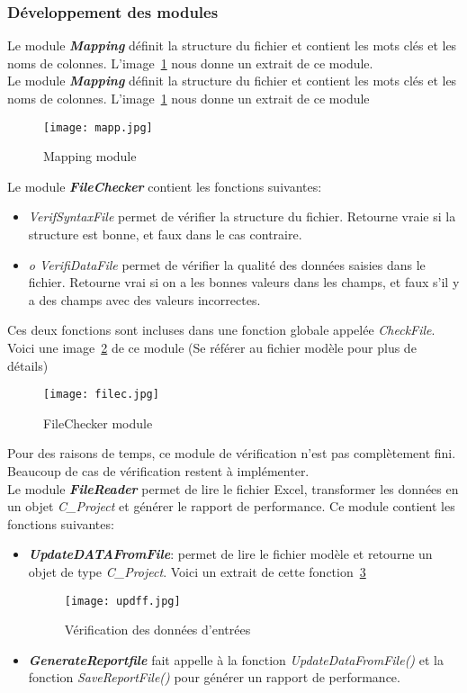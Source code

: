 \subsubsection*{Développement des modules}
Le module \textbf{\textit{Mapping}} définit la structure du fichier et contient les mots clés et les noms de colonnes. L'image~\ref{mapp} nous donne un extrait de ce module.\\
Le module \textbf{\textit{Mapping}} définit la structure du fichier et contient les mots clés et les noms de colonnes. L'image~\ref{mapp} nous donne un extrait de ce module
\begin{figure}[h]
\centering
\texttt{[image: mapp.jpg]}
\caption{\label{mapp}Mapping module}
\end{figure}
\clearpage
Le module \textbf{\textit{FileChecker}} contient les fonctions suivantes:
\begin{itemize}
\item \textit{VerifSyntaxFile} permet de vérifier la structure du fichier. Retourne vraie si la structure est bonne, et faux dans le cas contraire.
\item \textit{o	VerifiDataFile} permet de vérifier la qualité des données saisies dans le fichier. Retourne vrai si on a les bonnes valeurs dans les champs, et faux s'il y a des champs avec des valeurs incorrectes.
\end{itemize}
Ces deux fonctions sont incluses dans une fonction globale appelée \textit{CheckFile}.\\
Voici une image~\ref{filec} de ce module (Se référer au fichier modèle pour plus de détails)
\clearpage
\begin{figure}[h]
\centering
\texttt{[image: filec.jpg]}
\caption{\label{filec}FileChecker module}
\end{figure}
Pour des raisons de temps, ce module de vérification n'est pas complètement fini. Beaucoup de cas de vérification restent à implémenter.\\
Le module \textbf{\textit{FileReader}} permet de lire le fichier Excel, transformer les données en un objet \textit{C\_Project} et générer le rapport de performance. Ce module contient les fonctions suivantes:
\begin{itemize}
\item \textbf{\textit{UpdateDATAFromFile}}: permet de lire le fichier modèle et retourne un objet de type \textit{C\_Project}. Voici un extrait de cette fonction~\ref{updff}
\clearpage
\begin{figure}[h]
\centering
\texttt{[image: updff.jpg]}
\caption{\label{updff}Vérification des données d'entrées}
\end{figure}
\item \textbf{\textit{GenerateReportfile}} fait appelle à la fonction \textit{UpdateDataFromFile()} et la fonction \textit{SaveReportFile()} pour générer un rapport de performance.
\end{itemize}
